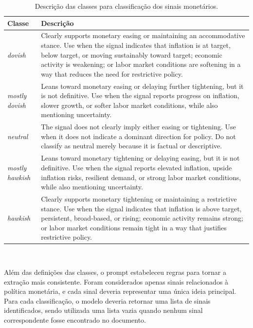 \begin{table}[H]
\centering
\caption{Descrição das classes para classificação dos sinais monetários.}
\label{tab:classes-sinais}
\begin{tabular}{p{} p{}}
\hline
\textbf{Classe} & \textbf{Descrição} \\
\hline
\textit{dovish} & Clearly supports monetary easing or maintaining an 
accommodative stance. Use when the signal indicates that inflation is 
at target, below target, or moving sustainably toward target; economic 
activity is weakening; or labor market conditions are softening in a 
way that reduces the need for restrictive policy. \\
\hline
\textit{mostly dovish} & Leans toward monetary easing or delaying 
further tightening, but it is not definitive. Use when the signal 
reports progress on inflation, slower growth, or softer labor market 
conditions, while also mentioning uncertainty. \\
\hline
\textit{neutral} & The signal does not clearly imply either easing 
or tightening. Use when it does not indicate a dominant direction 
for policy. Do not classify as neutral merely because it is factual 
or descriptive. \\
\hline
\textit{mostly hawkish} & Leans toward monetary tightening or 
delaying easing, but it is not definitive. Use when the signal 
reports elevated inflation, upside inflation risks, resilient demand, 
or strong labor market conditions, while also mentioning uncertainty. \\
\hline
\textit{hawkish} & Clearly supports monetary tightening or 
maintaining a restrictive stance. Use when the signal indicates 
that inflation is above target, persistent, broad-based, or rising; 
economic activity remains strong; or labor market conditions remain 
tight in a way that justifies restrictive policy. \\
\hline
\end{tabular}
\\
\end{table}


Além das definições das classes, o prompt estabeleceu regras para 
tornar a extração mais consistente. Foram considerados apenas sinais 
relacionados à política monetária, e cada sinal deveria representar uma 
única ideia principal. Para cada classificação, o modelo deveria retornar 
uma lista de sinais identificados, sendo utilizada uma lista vazia 
quando nenhum sinal correspondente fosse encontrado no documento.

